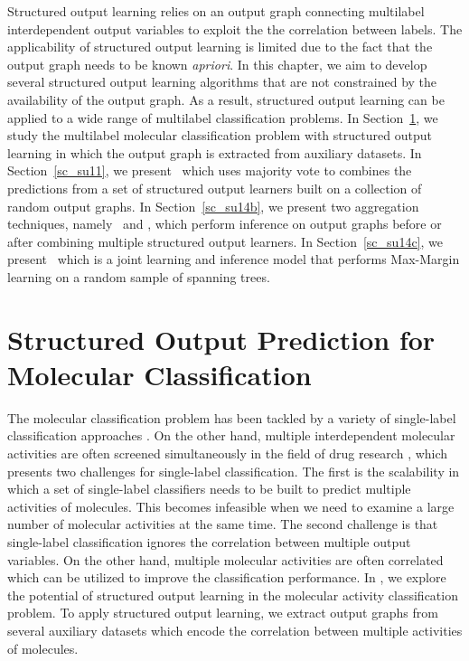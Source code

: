 {Structured output learning relies on an output graph connecting multilabel interdependent output variables to exploit the the correlation between labels.
The applicability of structured output learning is limited due to the fact that the output graph needs to be known \textit{apriori}.
In this chapter, we aim to develop several structured output learning algorithms that are not constrained by the availability of the output graph.
As a result, structured output learning can be applied to a wide range of multilabel classification problems.
In Section~\ref{sc_su10}, we study the multilabel molecular classification problem with structured output learning in which the output graph is extracted from auxiliary datasets.
In Section~\ref{sc_su11}, we present \mve\ which uses majority vote to combines the predictions from a set of structured output learners built on a collection of random output graphs.
In Section~\ref{sc_su14b}, we present two aggregation techniques, namely \amm\ and \mam, which perform inference on output graphs before or after combining multiple structured output learners.
In Section~\ref{sc_su14c}, we present \rta\ which is a joint learning and inference model that performs Max-Margin learning on a random sample of spanning trees.



%
%
\section{Structured Output Prediction for Molecular Classification} \label{sc_su10}

The molecular classification problem has been tackled by a variety of single-label classification approaches \citep{Menchetti05weighted,Singh12qsar,Dutt12classification}.
On the other hand, multiple interdependent molecular activities are often screened simultaneously in the field of drug research \citep{Shoemaker06the}, which presents two challenges for single-label classification.
The first is the scalability in which a set of single-label classifiers needs to be built to predict multiple activities of molecules.
This becomes infeasible when we need to examine a large number of molecular activities at the same time.
The second challenge is that single-label classification ignores the correlation between multiple output variables.
On the other hand, multiple molecular activities are often correlated which can be utilized to improve the classification performance.
In , we explore the potential of structured output learning in the molecular activity classification problem.
To apply structured output learning, we extract output graphs from several auxiliary datasets which encode the correlation between multiple activities of molecules.


}
